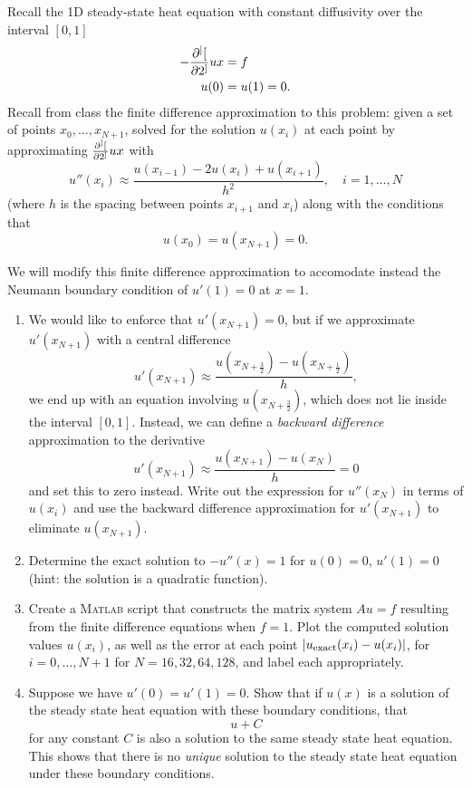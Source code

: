 Recall the 1D steady-state heat equation with constant diffusivity over the interval $[0,1]$
\begin{align*}
-\frac{\partial^{]} [}{\partial 2^{]}}{u}{x} &= f\\
u(0) &= u(1) = 0.
\end{align*}
Recall from class the finite difference approximation to this problem: given a set of points $x_0,\ldots, x_{N+1}$, solved for the solution $u(x_i)$ at each point by approximating $\frac{\partial^{]} [}{\partial 2^{]}}{u}{x}$ with
\[
u''({x_i}) \approx \frac{u(x_{i-1}) - 2u(x_i) + u(x_{i+1})}{h^2}, \quad i = 1,\ldots, N
\]
(where $h$ is the spacing between points $x_{i+1}$ and $x_i$) along with the conditions that
\[
u(x_0) = u(x_{N+1}) = 0.
\]

We will modify this finite difference approximation to accomodate instead the Neumann boundary condition of $u'(1) = 0$ at $x=1$.
\begin{enumerate}
\item We would like to enforce that $u'(x_{N+1}) = 0$, but if we approximate $u'(x_{N+1})$ with a central difference
\[
u'(x_{N+1}) \approx \frac{u(x_{N+\frac{3}{2}})-u(x_{N+\frac{1}{2}})}{h},
\]
we end up with an equation involving $u(x_{N+\frac{3}{2}})$, which does not lie inside the interval $[0,1]$. Instead, we can define a \textit{backward difference} approximation to the derivative
\[
u'(x_{N+1}) \approx \frac{u(x_{N+1})-u(x_N)}{h} = 0
\]
and set this to zero instead. Write out the expression for $u''(x_N)$ in terms of $u(x_i)$ and use the backward difference approximation for $u'(x_{N+1})$ to eliminate $u(x_{N+1})$.
\item Determine the exact solution to $-u''(x) = 1$ for $u(0) = 0$, $u'(1) = 0$ (hint: the solution is a quadratic function).
\item Create a \textsc{Matlab} script that constructs the matrix system $Au = f$ resulting from the finite difference equations when $f = 1$.  Plot the computed solution values $u(x_i)$, as well as the error at each point $|u_{\rm exact}(x_i)-u(x_i)|$, for $i = 0,\ldots, N+1$ for $N = 16, 32, 64, 128$, and label each appropriately.
\item Suppose we have $u'(0) = u'(1) = 0$. Show that if $u(x)$ is a solution of the steady state heat equation with these boundary conditions, that
\[
u + C
\]
for any constant $C$ is also a solution to the same steady state heat equation. This shows that there is no \textit{unique} solution to the steady state heat equation under these boundary conditions.
\end{enumerate}


